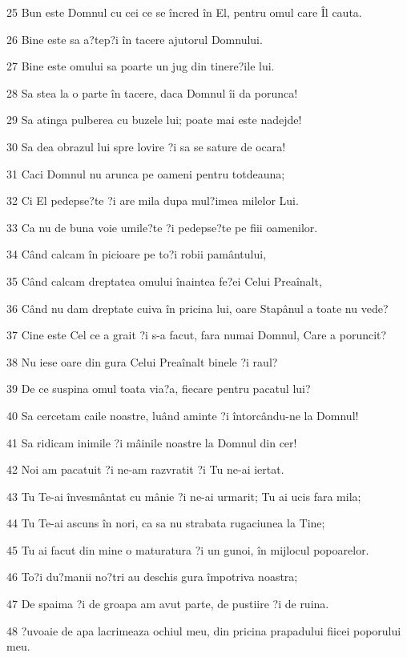 \par 25 Bun este Domnul cu cei ce se încred în El, pentru omul care Îl cauta.
\par 26 Bine este sa a?tep?i în tacere ajutorul Domnului.
\par 27 Bine este omului sa poarte un jug din tinere?ile lui.
\par 28 Sa stea la o parte în tacere, daca Domnul îi da porunca!
\par 29 Sa atinga pulberea cu buzele lui; poate mai este nadejde!
\par 30 Sa dea obrazul lui spre lovire ?i sa se sature de ocara!
\par 31 Caci Domnul nu arunca pe oameni pentru totdeauna;
\par 32 Ci El pedepse?te ?i are mila dupa mul?imea milelor Lui.
\par 33 Ca nu de buna voie umile?te ?i pedepse?te pe fiii oamenilor.
\par 34 Când calcam în picioare pe to?i robii pamântului,
\par 35 Când calcam dreptatea omului înaintea fe?ei Celui Preaînalt,
\par 36 Când nu dam dreptate cuiva în pricina lui, oare Stapânul a toate nu vede?
\par 37 Cine este Cel ce a grait ?i s-a facut, fara numai Domnul, Care a poruncit?
\par 38 Nu iese oare din gura Celui Preaînalt binele ?i raul?
\par 39 De ce suspina omul toata via?a, fiecare pentru pacatul lui?
\par 40 Sa cercetam caile noastre, luând aminte ?i întorcându-ne la Domnul!
\par 41 Sa ridicam inimile ?i mâinile noastre la Domnul din cer!
\par 42 Noi am pacatuit ?i ne-am razvratit ?i Tu ne-ai iertat.
\par 43 Tu Te-ai învesmântat cu mânie ?i ne-ai urmarit; Tu ai ucis fara mila;
\par 44 Tu Te-ai ascuns în nori, ca sa nu strabata rugaciunea la Tine;
\par 45 Tu ai facut din mine o maturatura ?i un gunoi, în mijlocul popoarelor.
\par 46 To?i du?manii no?tri au deschis gura împotriva noastra;
\par 47 De spaima ?i de groapa am avut parte, de pustiire ?i de ruina.
\par 48 ?uvoaie de apa lacrimeaza ochiul meu, din pricina prapadului fiicei poporului meu.
